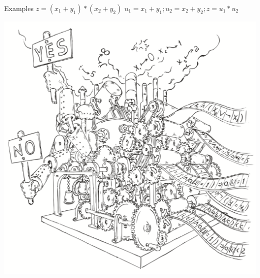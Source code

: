 \documentclass{beamer}
\begin{document}
\begin{frame}{Examples}
$z = (x_1 + y_1) * (x_2 + y_2)$\newline
$u_1 = x_1 + y_1; u_2 = x_2 + y_2; z = u_1 * u_2$
\end{frame}

\begin{frame}
\includegraphics[scale=0.5]{../decision-procedure.png}
\end{frame}
\end{document}

